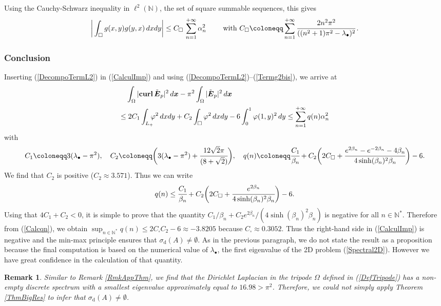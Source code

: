 \documentclass[11pt,a4paper]{article}
\newcommand{\dsp}{\displaystyle}
\newcommand{\Om}{\Omega}
\newcommand{\mrm}[1]{\mathrm{#1}}
\newcommand{\bfx}{\boldsymbol{x}}
\newcommand{\N}{\mathbb{N}}
\newcommand{\curlvec}{\boldsymbol{\mrm{curl}}\,}
\newcommand{\GL}{L}
\def\E{\boldsymbol{E}}
\newtheorem{remark}[theorem]{Remark}
\begin{document}
Using the Cauchy-Schwarz inequality in $\ell^2(\N)$, the set of square summable sequences, this gives  
\begin{equation}\label{Termg2bis}
\bigg|\int_{\square}g(x,y)g(y,x)\,dxdy\bigg| \le C_{\square}\,\sum_{n=1}^{+\infty} \alpha^2_n\qquad\mbox{ with }C_{\square}\coloneqq\sum_{n=1}^{+\infty} \cfrac{2n^2\pi^2}{((n^2+1)\pi^2-\lambda_\bullet)^2}\,.
\end{equation}
\subsubsection*{Conclusion}
Inserting (\ref{DecompoTermL2}) in (\ref{CalculImp}) and using (\ref{DecompoTermL2})--(\ref{Termg2bis}),  we arrive at 
\[
\begin{array}{l}
\phantom{\le}\dsp\int_{\Om} |\curlvec\tilde{\E}_{p}|^2\,d\bfx-\pi^2\int_{\Om} |\tilde{\E}_{p}|^2\,d\bfx \\[10pt] 
\le 2C_1\dsp\int_{\GL_+}\hspace{-0.2cm}\varphi^2\,dxdy+C_2\dsp\int_{\square}\varphi^2\,dxdy -6\int_0^1\varphi(1,y)^2\,dy\le  \dsp\sum_{n=1}^{+\infty}q(n)\alpha_n^2
\end{array}
\]
with 
\[
C_1\coloneqq3(\lambda_\bullet-\pi^2),\quad C_2\coloneqq\bigg(3(\lambda_\bullet-\pi^2)+\cfrac{12\sqrt{2}\pi}{(8+\sqrt{2})}\bigg),\quad q(n)\coloneqq\cfrac{C_1}{\beta_n}+C_2\bigg(2C_{\square}+\cfrac{e^{2\beta_n} - e^{-2\beta_n} - 4\beta_n}{4\sinh(\beta_n)^2\beta_n}\bigg)-6.
\]
We find that $C_2$ is positive ($C_2\approx3.571$). Thus we can write
\begin{equation}\label{Calcqn}
q(n) \le \cfrac{C_1}{\beta_n}+C_2\bigg(2C_{\square}+\cfrac{e^{2\beta_n}}{4\sinh(\beta_n)^2\beta_n}\bigg)-6.
\end{equation}
Using that $4C_1+C_2<0$, it is simple to prove that the quantity $C_1/\beta_n+C_2e^{2\beta_n}/(4\sinh(\beta_n)^2\beta_n)$ is negative for all $n\in\N^\ast$. Therefore from (\ref{Calcqn}), we obtain $\sup_{n\in\N^\ast}q(n) \le 2C_{\square}C_2-6\approx -3.8205$ because $C_\square\approx0.3052$. Thus the right-hand side in (\ref{CalculImp}) is negative and the min-max principle ensures that $\sigma_{\mrm{d}}(A)\ne\emptyset$. As in the previous paragraph, we do not state the result as a proposition because the final computation is based on the numerical value of $\lambda_\bullet$, the first eigenvalue of the 2D problem (\ref{Spectral2D}). However we have great confidence in the calculation of that quantity. 

\begin{remark}
Similar to Remark \ref{RmkAppThm}, we find that the Dirichlet Laplacian in the tripode $\Om$ defined in (\ref{DefTripode}) 
has a non-empty discrete spectrum with a smallest eigenvalue approximately equal to $16.98>\pi^2$. Therefore, we could not simply apply Theorem \ref{ThmBigRes} to infer that $\sigma_{\mrm{d}}(A)\ne\emptyset$.
\end{remark}
\end{document}
